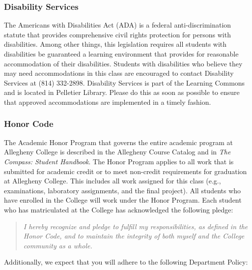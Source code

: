 \documentclass[11pt]{article} %
\begin{document}
\subsubsection*{\textbf{Disability Services}}

The Americans with Disabilities Act (ADA) is a federal anti-discrimination statute that provides comprehensive civil rights protection for persons with disabilities. Among other things, this legislation requires all students with disabilities be guaranteed a learning environment that provides for reasonable accommodation of their disabilities. Students with disabilities who believe they may need accommodations in this class are encouraged to contact Disability Services at (814) 332-2898.  Disability Services is part of the Learning Commons and is located in Pelletier Library. Please do this as soon as possible to ensure that approved accommodations are implemented in a timely fashion.

\subsubsection*{\textbf{Honor Code}}

The Academic Honor Program that governs the entire academic program at Allegheny College is described in the Allegheny Course Catalog and in \emph{The Compass: Student Handbook}.  The Honor Program applies to all work that is submitted for academic credit or to meet non-credit requirements for graduation at Allegheny College.  This includes all work assigned for this class (e.g., examinations, laboratory assignments, and the final project).  All students who have enrolled in the College will work under the Honor Program. Each student who has matriculated at the College has acknowledged the following pledge:

\vspace*{-.1in}
\begin{quote}
\emph{I hereby recognize and pledge to fulfill my responsibilities, as defined in the Honor Code, and to maintain the integrity of both myself and the College community as a whole.}
\end{quote}
\vspace*{-.1in}

\noindent Additionally, we expect that you will adhere to the following Department Policy:
\end{document}
